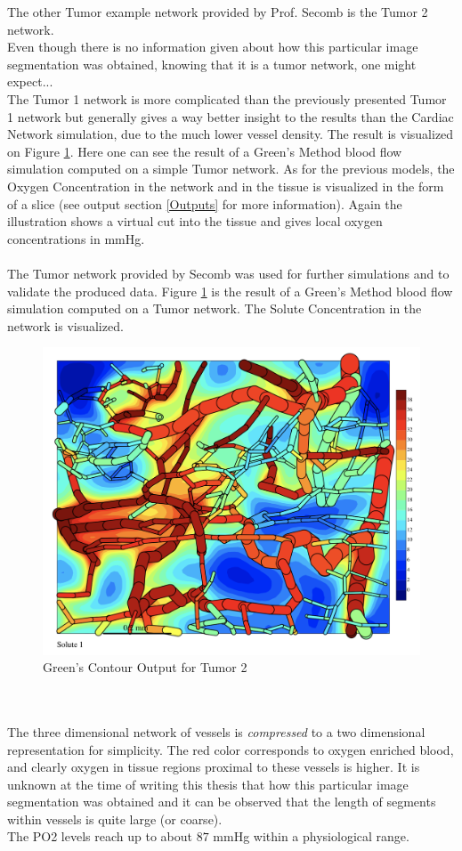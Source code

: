 The other Tumor example network provided by Prof. Secomb is the Tumor 2 network.
\\Even though there is no information given about how this particular image segmentation was obtained, knowing that it is a tumor network, one might expect...
\\The Tumor 1 network is more complicated than the previously presented Tumor 1 network but generally gives a way better insight to the results than the Cardiac Network simulation, due to the much lower vessel density. The result is visualized on Figure \ref{fig:Contour_TumorDuke}. Here one can see the result of a Green's Method blood flow simulation computed on a simple Tumor network. As for the previous models, the Oxygen Concentration in the network and in the tissue is visualized in the form of a slice (see output section \ref{Outputs} for more information). Again the illustration shows a virtual cut into the tissue and gives local oxygen concentrations in mmHg.\\\\
The Tumor network provided by Secomb was used for further simulations and to validate the produced data.
Figure \ref{fig:Contour_TumorDuke}  is the result of a Green's Method blood flow simulation computed on a Tumor network. The Solute Concentration in the network is visualized.\\
\begin{figure}[h]
\centering
\includegraphics[width=120mm]{Contour_TumorDuke}
\caption{\footnotesize Green's Contour Output for Tumor 2}
\label{fig:Contour_TumorDuke}
\end{figure}\\
\\The three dimensional network of vessels is \emph{compressed} to a two
dimensional representation for simplicity.  The red color corresponds to oxygen enriched blood, and clearly oxygen in tissue regions proximal to these vessels is higher. It is unknown at the time of writing this thesis that how this particular image segmentation was obtained and it can be observed that the length of segments within vessels is quite large (or coarse).
\\The PO2 levels reach up to about $87$ mmHg within a physiological range. 

